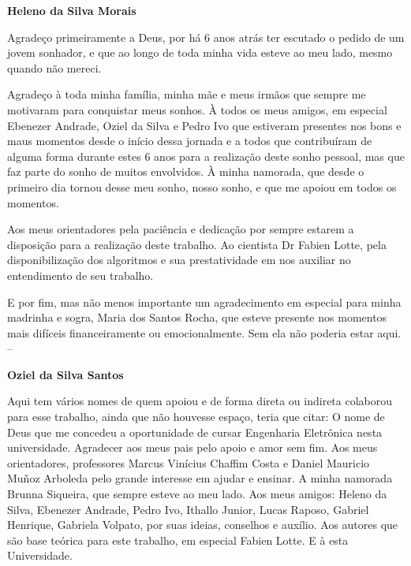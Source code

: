 \begin{agradecimentos}
   \textbf{Heleno da Silva Morais}
	\vspace*{\fill}
	\begin{flushleft}
		Agradeço primeiramente a Deus, por há 6 anos atrás ter escutado o pedido de um jovem sonhador, e que ao longo de toda minha vida esteve ao meu lado, mesmo quando não mereci.
		
		Agradeço à toda minha família, minha mãe e meus irmãos que sempre me motivaram para conquistar meus sonhos. À todos os meus amigos, em especial Ebenezer Andrade, Oziel da Silva e Pedro Ivo que estiveram presentes nos bons e maus momentos desde o início dessa jornada e a todos que contribuíram de alguma forma durante estes 6 anos para a realização deste sonho pessoal, mas que faz parte do sonho de muitos envolvidos. À minha namorada, que desde o primeiro dia tornou desse meu sonho, nosso sonho, e que me apoiou em todos os momentos.
		
		Aos meus orientadores pela paciência e dedicação por sempre estarem a disposição para a realização deste trabalho. Ao cientista Dr Fabien Lotte, pela disponibilização dos algoritmos e sua prestatividade em nos auxiliar no entendimento de seu trabalho.
		
		E por fim, mas não menos importante um agradecimento em especial para minha madrinha e sogra, Maria dos Santos Rocha, que esteve presente nos momentos mais difíceis financeiramente ou emocionalmente. Sem ela não poderia estar aqui.
--
\end{flushleft}
\vspace*{\fill}

\pagebreak

\textbf{Oziel da Silva Santos}

\vspace*{\fill}
\begin{flushleft}

Aqui tem vários nomes de quem apoiou e de forma direta ou indireta colaborou para esse trabalho, ainda que não houvesse espaço,
teria que citar:
O nome de Deus que me concedeu a oportunidade de cursar Engenharia Eletrônica nesta universidade. 
Agradecer aos meus pais pelo apoio e amor sem fim.
Aos meus orientadores, professores  Marcus Vinícius Chaffim Costa e Daniel Mauricio Muñoz Arboleda pelo grande interesse em ajudar e ensinar.
A minha namorada Brunna Siqueira, que sempre esteve ao meu lado.
Aos meus amigos: Heleno da Silva, Ebenezer Andrade, Pedro Ivo, Ithallo Junior, Lucas Raposo, Gabriel Henrique, Gabriela Volpato, por suas ideias, conselhos e auxílio.
Aos autores que são base teórica para este trabalho, em especial Fabien Lotte.
E à esta Universidade.

\end{flushleft}
\vspace*{\fill}
\end{agradecimentos}
